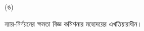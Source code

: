 \documentclass[12pt]{article}
\begin{document}
\begin{minipage}[t]{0.05\linewidth}
(ঙ)
\end{minipage}
\begin{minipage}[t]{0.90\linewidth}
ন্যায়-নির্ণয়নের ক্ষমতা বিজ্ঞ কমিশনার মহোদয়ের এখতিয়ারাধীন।
\end{minipage}
\end{document}
